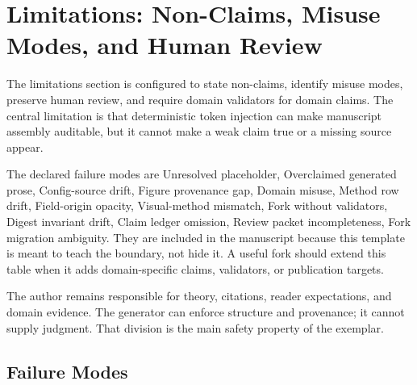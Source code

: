 \documentclass[
  english,
]{article}
\begin{document}
\section{Limitations: Non-Claims, Misuse Modes, and Human
Review}\label{limitations-non-claims-misuse-modes-and-human-review}

The limitations section is configured to state non-claims, identify
misuse modes, preserve human review, and require domain validators for
domain claims. The central limitation is that deterministic token
injection can make manuscript assembly auditable, but it cannot make a
weak claim true or a missing source appear.

The declared failure modes are Unresolved placeholder, Overclaimed
generated prose, Config-source drift, Figure provenance gap, Domain
misuse, Method row drift, Field-origin opacity, Visual-method mismatch,
Fork without validators, Digest invariant drift, Claim ledger omission,
Review packet incompleteness, Fork migration ambiguity. They are
included in the manuscript because this template is meant to teach the
boundary, not hide it. A useful fork should extend this table when it
adds domain-specific claims, validators, or publication targets.

The author remains responsible for theory, citations, reader
expectations, and domain evidence. The generator can enforce structure
and provenance; it cannot supply judgment. That division is the main
safety property of the exemplar.

\subsection{Failure Modes}\label{failure-modes}
\end{document}

